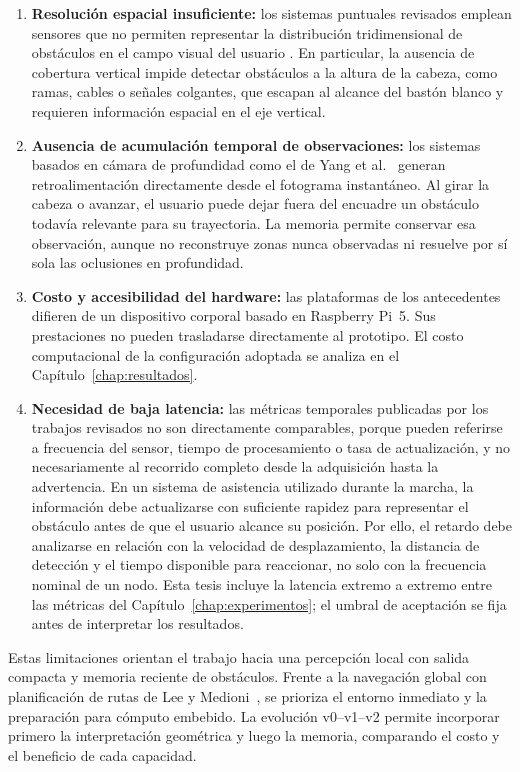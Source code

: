\begin{enumerate}
    \item \textbf{Resolución espacial insuficiente:} los sistemas puntuales revisados emplean
    sensores que no permiten representar la distribución tridimensional de obstáculos en el campo
    visual del usuario \cite{Dakopoulos2010, Santos2023, Petsiuk2019UltrasoundNavigation}. En
    particular, la ausencia de cobertura vertical impide detectar obstáculos a la altura de la
    cabeza, como ramas, cables o señales colgantes, que escapan al alcance del bastón blanco y
    requieren información espacial en el eje vertical.

    \item \textbf{Ausencia de acumulación temporal de observaciones:} los sistemas basados en
    cámara de profundidad como el de Yang et al.\ \cite{Yang2016} generan retroalimentación
    directamente desde el fotograma instantáneo. Al girar la cabeza o avanzar, el usuario puede
    dejar fuera del encuadre un obstáculo todavía relevante para su trayectoria. La memoria
    permite conservar esa observación, aunque no reconstruye zonas nunca observadas ni resuelve
    por sí sola las oclusiones en profundidad.

    \item \textbf{Costo y accesibilidad del hardware:} las plataformas de los antecedentes
    difieren de un dispositivo corporal basado en Raspberry Pi~5. Sus prestaciones no pueden
    trasladarse directamente al prototipo. El costo computacional de la configuración adoptada
    se analiza en el Capítulo~\ref{chap:resultados}.

    \item \textbf{Necesidad de baja latencia:} las métricas temporales publicadas por los trabajos
    revisados no son directamente comparables, porque pueden referirse a frecuencia del sensor,
    tiempo de procesamiento o tasa de actualización, y no necesariamente al recorrido completo
    desde la adquisición hasta la advertencia. En un sistema de asistencia utilizado durante la
    marcha, la información debe actualizarse con suficiente rapidez para representar el obstáculo
    antes de que el usuario alcance su posición. Por ello, el retardo debe analizarse en relación
    con la velocidad de desplazamiento, la distancia de detección y el tiempo disponible para
    reaccionar, no solo con la frecuencia nominal de un nodo. Esta tesis incluye la latencia extremo
    a extremo entre las métricas del Capítulo~\ref{chap:experimentos}; el umbral de aceptación
    se fija antes de interpretar los resultados.
\end{enumerate}

Estas limitaciones orientan el trabajo hacia una percepción local con salida compacta y memoria
reciente de obstáculos. Frente a la navegación global con planificación de rutas de Lee y
Medioni~\cite{Lee2016RGBD}, se prioriza el entorno inmediato y la preparación para cómputo
embebido. La evolución v0--v1--v2 permite incorporar primero la interpretación geométrica y luego
la memoria, comparando el costo y el beneficio de cada capacidad.
